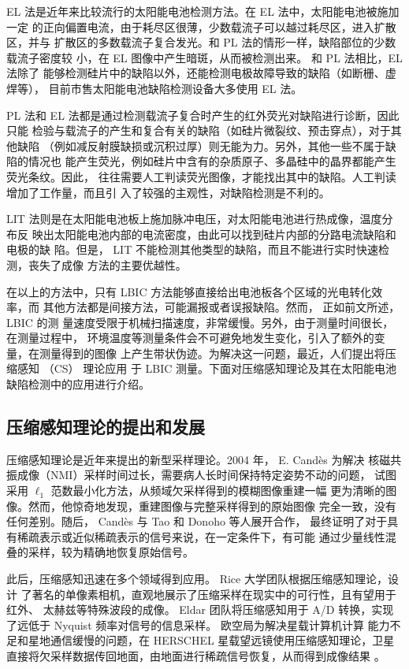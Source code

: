 EL 法是近年来比较流行的太阳能电池检测方法。在 EL 法中，太阳能电池被施加一定
的正向偏置电流，由于耗尽区很薄，少数载流子可以越过耗尽区，进入扩散区，并与
扩散区的多数载流子复合发光。和 PL 法的情形一样，缺陷部位的少数载流子密度较
小，在 EL 图像中产生暗斑，从而被检测出来\cite{EL}。 和 PL 法相比，EL 法除了
能够检测硅片中的缺陷以外，还能检测电极故障导致的缺陷（如断栅、虚焊等），
目前市售太阳能电池缺陷检测设备大多使用 EL 法。

PL 法和 EL 法都是通过检测载流子复合时产生的红外荧光对缺陷进行诊断，因此只能
检验与载流子的产生和复合有关的缺陷（如硅片微裂纹、预击穿点），对于其他缺陷
（例如减反射膜缺损或沉积过厚）则无能为力。另外，其他一些不属于缺陷的情况也
能产生荧光，例如硅片中含有的杂质原子、多晶硅中的晶界都能产生荧光条纹。因此，
往往需要人工判读荧光图像，才能找出其中的缺陷。人工判读增加了工作量，而且引
入了较强的主观性，对缺陷检测是不利的。

LIT 法则是在太阳能电池板上施加脉冲电压，对太阳能电池进行热成像，温度分布反
映出太阳能电池内部的电流密度，由此可以找到硅片内部的分路电流缺陷和电极的缺
陷。但是， LIT 不能检测其他类型的缺陷，而且不能进行实时快速检测，丧失了成像
方法的主要优越性。

在以上的方法中，只有 LBIC 方法能够直接给出电池板各个区域的光电转化效率，而
其他方法都是间接方法，可能漏报或者误报缺陷。然而， 正如前文所述， LBIC 的测
量速度受限于机械扫描速度，非常缓慢。另外，由于测量时间很长，在测量过程中，
环境温度等测量条件会不可避免地发生变化，引入了额外的变量，在测量得到的图像
上产生带状伪迹。为解决这一问题，最近，人们提出将压缩感知 （CS） 理论应用
于 LBIC 测量。下面对压缩感知理论及其在太阳能电池缺陷检测中的应用进行介绍。 

\subsection{压缩感知理论的提出和发展}

压缩感知理论是近年来提出的新型采样理论。2004 年， E. Cand\`es 为解决
核磁共振成像（NMI）采样时间过长，需要病人长时间保持特定姿势不动的问题，
试图采用 $\ell_1$ 范数最小化方法，从频域欠采样得到的模糊图像重建一幅
更为清晰的图像。然而，他惊奇地发现，重建图像与完整采样得到的原始图像
完全一致，没有任何差别。随后， Cand\`es 与 Tao 和 Donoho 等人展开合作，
最终证明了对于具有稀疏表示或近似稀疏表示的信号来说，在一定条件下，有可能
通过少量线性混叠的采样，较为精确地恢复原始信号\cite{CS2006}。

此后，压缩感知迅速在多个领域得到应用。 Rice 大学团队根据压缩感知理论，设计
了著名的单像素相机，直观地展示了压缩采样在现实中的可行性，且有望用于红外、
太赫兹等特殊波段的成像\cite{SinglePixel}。 Eldar 团队将压缩感知用于 A/D
转换，实现了远低于 Nyquist 频率对信号的信息采样\cite{CSAD}。 
欧空局为解决星载计算机计算
能力不足和星地通信缓慢的问题，在 HERSCHEL 星载望远镜使用压缩感知理论，卫星
直接将欠采样数据传回地面，由地面进行稀疏信号恢复，从而得到成像结果
\cite{HERSCHEL}。


